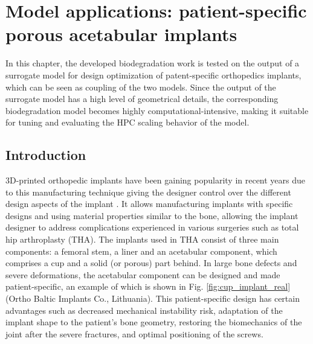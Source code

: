 \chapter{Model applications: patient-specific porous acetabular implants}\label{ch:cup}

\noindent{}
\bigskip

In this chapter, the developed biodegradation work is tested on the output of a surrogate model for design optimization of patent-specific orthopedics implants, which can be seen as coupling of the two models. Since the output of the surrogate model has a high level of geometrical details, the corresponding biodegradation model becomes highly computational-intensive, making it suitable for tuning and evaluating the HPC scaling behavior of the model.

\section{Introduction}

3D-printed orthopedic implants have been gaining popularity in recent years due to this manufacturing technique giving the designer control over the different design aspects of the implant \cite{Kumar2021,Yadav2020}. It allows manufacturing implants with specific designs and using material properties similar to the bone, allowing the implant designer to address complications experienced in various surgeries such as total hip arthroplasty ({THA}). The implants used in {THA} consist of three main components: a femoral stem, a liner and an acetabular component, which comprises a cup and a solid (or porous) part behind. In large bone defects and severe deformations, the acetabular component can be designed and made patient-specific, an example of which is shown in Fig. \ref{fig:cup_implant_real} (Ortho Baltic Implants Co., Lithuania). This patient-specific design has certain advantages such as decreased mechanical instability risk, adaptation of the implant shape to the patient's bone geometry, restoring the biomechanics of the joint after the severe fractures, and optimal positioning of the screws.

